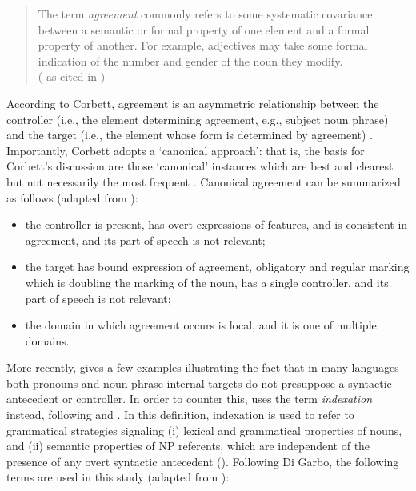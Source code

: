 \documentclass[output=collectionpaper]{langsci/langscibook}
\begin{document}
\begin{quote}
The term \textit{agreement} commonly refers to some systematic covariance between a semantic or formal property of one element and a formal property of another. For example, adjectives may take some formal indication of the number and gender of the noun they modify. \\
(\citealt[610]{Steele1978} as cited in \citealt[105]{Corbett1991})
\end{quote}

According to Corbett, agreement is an asymmetric relationship between the controller (i.e., the element determining agreement, e.g., subject noun phrase) and the target (i.e., the element whose form is determined by agreement) \citep[4]{Corbett2006}. Importantly, Corbett adopts a `canonical approach': that is, the basis for Corbett's discussion are those `canonical' instances which are best and clearest but not necessarily the most frequent \citep[9]{Corbett2006}. Canonical agreement can be summarized as follows (adapted from \citealt[9]{Corbett2006}):

\begin{itemize}
\item the controller is present, has overt expressions of features, and is consistent in agreement, and its part of speech is not relevant;
\item the target has bound expression of agreement, obligatory and regular marking which is doubling the marking of the noun, has a single controller, and its part of speech is not relevant;
\item the domain in which agreement occurs is local, and it is one of multiple domains.
\end{itemize}

More recently, \citet[8]{DiGarbo2014} gives a few examples illustrating the fact that in many languages both pronouns and noun phrase-internal targets do not presuppose a syntactic antecedent or controller. In order to counter this, \citet{DiGarbo2014} uses the term \textit{indexation} instead, following \citet{Croft2001,Croft2003,Croft2013} and \citet{Iemmolo2011}. In this definition, indexation is used to refer to grammatical strategies signaling (i) lexical and grammatical properties of nouns, and (ii) semantic properties of NP referents, which are independent of the presence of any overt syntactic antecedent (\citealt[8]{DiGarbo2014}). Following Di Garbo, the following terms are used in this study (adapted from \citealt[8]{DiGarbo2014}):
\end{document}
